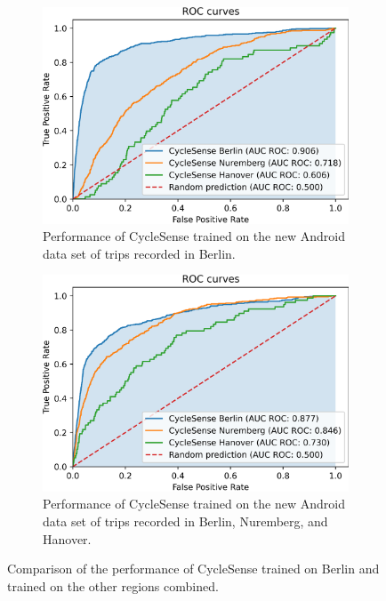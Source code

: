\begin{figure}[t]
	\centering
	\begin{subfigure}[b]{0.475\textwidth}
		\centering
		\includegraphics[width=\textwidth]{fig/city_comp_before.png}
		\caption{\small Performance of CycleSense trained on the new Android data set of trips recorded in Berlin. \newline}
		\label{fig:different-city-trained-on-berlin}
	\end{subfigure}
	\hfill
	\begin{subfigure}[b]{0.475\textwidth}
		\centering
		\includegraphics[width=\textwidth]{fig/city_comp_after.png}
		\caption{\small Performance of CycleSense trained on the new Android data set of trips recorded in Berlin, Nuremberg, and Hanover.}
		\label{fig:different-city-trained-individually}
	\end{subfigure}
	\caption{Comparison of the performance of CycleSense trained on Berlin and trained on the other regions combined.}
\end{figure}

